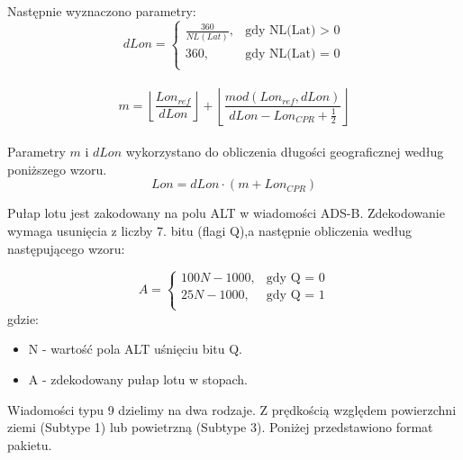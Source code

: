 \documentclass[eng,printmode]{mgr}
\newcommand{\floor}[1]{\left\lfloor #1 \right\rfloor}
\begin{document}
\noindent
Następnie wyznaczono parametry:
\begin{equation}
\renewcommand*{\arraystretch}{1.3}
dLon= \left\{ \begin{array}{ll}

\frac{360}{NL(Lat)}, & \textrm{gdy NL(Lat) > 0}\\
360 , & \textrm{gdy NL(Lat) = 0}\\

\end{array} \right.
\end{equation}
\\
\begin{equation}
m = \floor{\frac{Lon_{ref}}{dLon}} + \floor{\frac{mod(Lon_{ref},dLon)}{dLon - Lon_{CPR} + \frac{1}{2}}}
\end{equation}
\\


Parametry $m$ i $dLon$ wykorzystano do obliczenia długości geograficznej według poniższego wzoru.
\begin{equation}
Lon = dLon \cdot \left(m + Lon_{CPR}\right)
\end{equation}
\vskip 0.3cm

Pułap lotu jest zakodowany na polu ALT w wiadomości ADS-B. Zdekodowanie wymaga usunięcia z liczby 7. bitu (flagi Q),a następnie obliczenia według następującego wzoru:

\begin{equation}
\renewcommand*{\arraystretch}{1.3}
A= \left\{ \begin{array}{ll}

100N - 1000, & \textrm{gdy Q = 0}\\
25N - 1000, & \textrm{gdy Q = 1}\\

\end{array} \right.
\end{equation}
\noindent
gdzie: 
\begin{itemize}
\item N - wartość pola ALT uśnięciu bitu Q.
\item A - zdekodowany pułap lotu w stopach.
\end{itemize}

Wiadomości typu 9 dzielimy na dwa rodzaje. Z prędkością względem powierzchni ziemi (Subtype 1) lub powietrzną (Subtype 3). Poniżej przedstawiono format pakietu.
\end{document}
